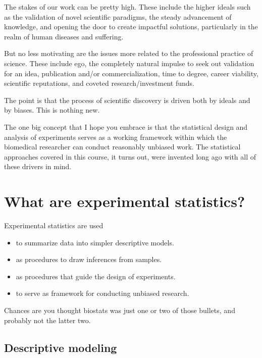 \documentclass[]{book}
\providecommand{\tightlist}{%
  \setlength{\itemsep}{0pt}\setlength{\parskip}{0pt}}
\begin{document}
The stakes of our work can be pretty high. These include the higher ideals such as the validation of novel scientific paradigms, the steady advancement of knowledge, and opening the door to create impactful solutions, particularly in the realm of human diseases and suffering.

But no less motivating are the issues more related to the professional practice of science. These include ego, the completely natural impulse to seek out validation for an idea, publication and/or commercialization, time to degree, career viability, scientific reputations, and coveted research/investment funds.

The point is that the process of scientific discovery is driven both by ideals and by biases. This is nothing new.

The one big concept that I hope you embrace is that the statistical design and analysis of experiments serves as a working framework within which the biomedical researcher can conduct reasonably unbiased work. The statistical approaches covered in this course, it turns out, were invented long ago with all of these drivers in mind.

\hypertarget{what-are-experimental-statistics}{%
\section{What are experimental statistics?}\label{what-are-experimental-statistics}}

Experimental statistics are used

\begin{itemize}
\tightlist
\item
  to summarize data into simpler descriptive models.
\item
  as procedures to draw inferences from samples.
\item
  as procedures that guide the design of experiments.
\item
  to serve as framework for conducting unbiased research.
\end{itemize}

Chances are you thought biostats was just one or two of those bullets, and probably not the latter two.

\hypertarget{descriptive-modeling}{%
\subsection{Descriptive modeling}\label{descriptive-modeling}}
\end{document}
